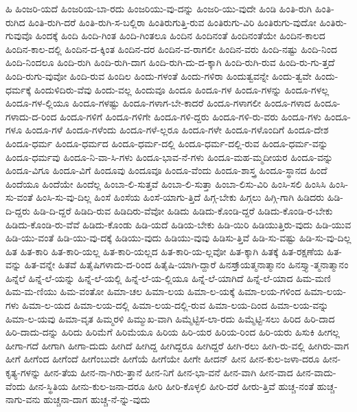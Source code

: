 {ಹಿ
ಹಿಂಜರಿ-ಯದೆ
ಹಿಂಜರಿಯ-ಬಾ-ರದು
ಹಿಂಜರಿಯು-ವು-ದನ್ನು
ಹಿಂಜರಿ-ಯು-ವುದೇ
ಹಿಂಡಿ
ಹಿಂತಿ-ರುಗಿ
ಹಿಂತಿ-ರುಗಿದ
ಹಿಂತಿ-ರುಗಿ-ದರೆ
ಹಿಂತಿ-ರುಗಿ-ಸ-ಬಲ್ಲಿರಾ
ಹಿಂತಿರುಗುತ್ತಿ-ರುವ
ಹಿಂತಿರುಗು-ವಿರಿ
ಹಿಂತಿರುಗು-ವುದೋ
ಹಿಂತಿರು-ಗುವುವೊ
ಹಿಂದಕ್ಕೆ
ಹಿಂದಿ
ಹಿಂದಿ-ಗಿಂತ
ಹಿಂದಿ-ಗಿಂತಲೂ
ಹಿಂದಿನ
ಹಿಂದಿನಂತೆ
ಹಿಂದಿನಂತೆಯೇ
ಹಿಂದಿನ-ಕಾಲದ
ಹಿಂದಿನ-ಕಾಲ-ದಲ್ಲಿ
ಹಿಂದಿನ-ದ-ಕ್ಕಿಂತ
ಹಿಂದಿನ-ದರ
ಹಿಂದಿನ-ವ-ರಾಗಲೀ
ಹಿಂದಿನ-ವರು
ಹಿಂದಿ-ನಷ್ಟು
ಹಿಂದಿ-ನಿಂದ
ಹಿಂದಿ-ನಿಂದಲೂ
ಹಿಂದಿ-ರುಗಿ
ಹಿಂದಿ-ರುಗಿ-ದಾಗ
ಹಿಂದಿ-ರುಗಿ-ದು-ದ-ಕ್ಕಾಗಿ
ಹಿಂದಿ-ರುಗಿ-ರುವ
ಹಿಂದಿ-ರು-ಗು-ತ್ತದೆ
ಹಿಂದಿ-ರುಗು-ವುವೋ
ಹಿಂದಿ-ರುವ
ಹಿಂದಿಲ
ಹಿಂದು-ಗಳಂತೆ
ಹಿಂದು-ಗಳಿರಾ
ಹಿಂದುತ್ವವನ್ನೇ
ಹಿಂದು-ತ್ವವೇ
ಹಿಂದು-ಧರ್ಮಕ್ಕೆ
ಹಿಂದುಳಿದಿರು-ವೆವು
ಹಿಂದು-ವಲ್ಲ
ಹಿಂದುವೂ
ಹಿಂದೂ
ಹಿಂದೂ-ಗಳ
ಹಿಂದೂ-ಗಳನ್ನು
ಹಿಂದೂ-ಗಳಲ್ಲ
ಹಿಂದೂ-ಗಳ-ಲ್ಲಿಯೂ
ಹಿಂದೂ-ಗಳಷ್ಟು
ಹಿಂದೂ-ಗಳಾಗ-ಬೇ-ಕಾದರೆ
ಹಿಂದೂ-ಗಳಾಗಲೀ
ಹಿಂದೂ-ಗಳಾದ
ಹಿಂದೂ-ಗಳಾದು-ದ-ರಿಂದ
ಹಿಂದೂ-ಗಳಿಗೆ
ಹಿಂದೂ-ಗಳಿಗೇ
ಹಿಂದೂ-ಗಳಿ-ದ್ದರು
ಹಿಂದೂ-ಗಳಿ-ರು-ವರು
ಹಿಂದೂ-ಗಳು
ಹಿಂದೂ-ಗಳೂ
ಹಿಂದೂ-ಗಳೆ
ಹಿಂದೂ-ಗಳೆಂದು
ಹಿಂದೂ-ಗಳೆ-ಲ್ಲರೂ
ಹಿಂದೂ-ಗಳೇ
ಹಿಂದೂ-ಗಳೊಂದಿಗೆ
ಹಿಂದೂ-ದೇಶ
ಹಿಂದೂ-ಧರ್ಮ
ಹಿಂದೂ-ಧರ್ಮದ
ಹಿಂದೂ-ಧರ್ಮ-ದಲ್ಲಿ
ಹಿಂದೂ-ಧರ್ಮ-ದಲ್ಲಿ-ರುವ
ಹಿಂದೂ-ಧರ್ಮ-ವನ್ನು
ಹಿಂದೂ-ಧರ್ಮವು
ಹಿಂದೂ-ನಿ-ವಾ-ಸಿ-ಗಳು
ಹಿಂದೂ-ಭಾವ-ನೆ-ಗಳು
ಹಿಂದೂ-ಮಹ-ಮ್ಮದೀಯರ
ಹಿಂದೂ-ವನ್ನು
ಹಿಂದೂ-ವಿಗೂ
ಹಿಂದೂ-ವಿಗೆ
ಹಿಂದೂವು
ಹಿಂದೂವೂ
ಹಿಂದೂ-ವೆಂದು
ಹಿಂದೂ-ಶಾಸ್ತ್ರ
ಹಿಂದೂ-ಸ್ಥಾನದ
ಹಿಂದೆ
ಹಿಂದೆಯೂ
ಹಿಂದೆಯೇ
ಹಿಂದೆಲ್ಲ
ಹಿಂಬಾ-ಲಿ-ಸುತ್ತವೆ
ಹಿಂಬಾ-ಲಿ-ಸುತ್ತಾ
ಹಿಂಬಾ-ಲಿಸು-ವಿರಿ
ಹಿಂಸಿ-ಸಲಿ
ಹಿಂಸಿಸಿ
ಹಿಂಸಿ-ಸು-ವಂತೆ
ಹಿಂಸಿ-ಸು-ವು-ದಿಲ್ಲ
ಹಿಂಸೆ
ಹಿಂಸೆಯ
ಹಿಂಸೆ-ಯಾಗು-ತ್ತಿದೆ
ಹಿಗ್ಗ-ಬೇಕು
ಹಿಗ್ಗಲು
ಹಿಗ್ಗಿ-ಗಾಗಿ
ಹಿಡಿದರು
ಹಿಡಿ-ದಿ-ದ್ದರು
ಹಿಡಿ-ದಿ-ದ್ದರೆ
ಹಿಡಿದಿ-ರುವ
ಹಿಡಿದಿರು-ವೆವೋ
ಹಿಡಿದು
ಹಿಡಿದು-ಕೊಂಡಿ-ದ್ದರೆ
ಹಿಡಿದು-ಕೊಂಡಿ-ರ-ಬೇಕು
ಹಿಡಿದು-ಕೊಂಡಿ-ರು-ವೆವೆ
ಹಿಡಿದು-ಕೊಂಡು
ಹಿಡಿ-ಯದೆ
ಹಿಡಿಯ-ಬೇಕು
ಹಿಡಿ-ಯಿರಿ
ಹಿಡಿಯುತ್ತಿರು-ವುದು
ಹಿಡಿ-ಯುವ
ಹಿಡಿ-ಯು-ವಂತೆ
ಹಿಡಿ-ಯು-ವು-ದಕ್ಕೆ
ಹಿಡಿಯು-ವುದು
ಹಿಡಿಯು-ವುವು
ಹಿಡಿಸು-ತ್ತಿವೆ
ಹಿಡಿ-ಸು-ವಷ್ಟು
ಹಿಡಿ-ಸು-ವು-ದಿಲ್ಲ
ಹಿತ
ಹಿತ-ಕಾರಿ
ಹಿತ-ಕಾರಿ-ಯಲ್ಲ
ಹಿತ-ಕಾರಿ-ಯಲ್ಲದ
ಹಿತ-ಕಾರಿ-ಯ-ಲ್ಲವೋ
ಹಿತ-ಕ್ಕಾಗಿ
ಹಿತಕ್ಕೆ
ಹಿತ-ರಕ್ಷಣೆಯ
ಹಿತ-ವನ್ನು
ಹಿತ-ವನ್ನೇ
ಹಿತವೆ
ಹಿತೈಷಿಗಳಾದು-ದ-ರಿಂದ
ಹಿತೈಷಿ-ಯಾಗಿ-ದ್ದಾರೆ
ಹಿನಸ್ತಾ್ಯತ್ಮನಾತ್ಮಾನಂ
ಹಿನಸ್ತ್ಯಾ-ತ್ಮನಾತ್ಮಾನಂ
ಹಿನ್ನೆಲೆ
ಹಿನ್ನೆ-ಲೆ-ಯನ್ನು
ಹಿನ್ನೆ-ಲೆ-ಯಲ್ಲಿ
ಹಿನ್ನೆ-ಲೆ-ಯ-ಲ್ಲಿಯೂ
ಹಿನ್ನೆ-ಲೆ-ಯಾಗಿದೆ
ಹಿನ್ನೆ-ಲೆ-ಯಾದ
ಹಿಮ-ಮಣಿ
ಹಿಮ-ಮ-ಣಿಯು
ಹಿಮ-ವಂತೋ
ಹಿಮಾ-ಚಲ
ಹಿಮಾ-ಲಯ
ಹಿಮಾ-ಲ-ಯಕ್ಕೆ
ಹಿಮಾ-ಲಯ-ಗಳಿಂದ
ಹಿಮಾ-ಲಯ-ಗಳು
ಹಿಮಾ-ಲ-ಯದ
ಹಿಮಾ-ಲಯ-ದಲ್ಲಿ
ಹಿಮಾ-ಲಯ-ದಲ್ಲಿ-ರುವ
ಹಿಮಾ-ಲಯ-ದಿಂದ
ಹಿಮಾ-ಲಯ-ವನ್ನು
ಹಿಮಾ-ಲ-ಯವು
ಹಿಮಾ-ವೃತ
ಹಿಮ್ಮರಳಿ
ಹಿಮ್ಮುಖ-ವಾಗಿ
ಹಿಮ್ಮೆಟ್ಟಿಸ-ಲಾ-ರದು
ಹಿಮ್ಮೆಟ್ಟಿ-ಸಲು
ಹಿರಿದ
ಹಿರಿ-ದಾದ
ಹಿರಿ-ದಾದು-ದನ್ನು
ಹಿರಿದು
ಹಿರಿಮೆಗೆ
ಹಿರಿಮೆಯೂ
ಹಿರಿಯ
ಹಿರಿ-ಯರ
ಹಿರಿಯ-ರಿಂದ
ಹಿರಿ-ಯರು
ಹಿಸುಕಿ
ಹೀಗಲ್ಲ
ಹೀಗಾ-ಗದೆ
ಹೀಗಾಗಿ
ಹೀಗಾ-ದುದು
ಹೀಗಿದೆ
ಹೀಗಿದ್ದ
ಹೀಗಿದ್ದರೂ
ಹೀಗಿದ್ದರೆ
ಹೀಗಿ-ರಲು
ಹೀಗಿ-ರು-ವಲ್ಲಿ
ಹೀಗಿರು-ವಾಗ
ಹೀಗೆ
ಹೀಗೆಂದ
ಹೀಗೆಂದೆ
ಹೀಗೆಂಬುದೇ
ಹೀಗೆಯೆ
ಹೀಗೆಯೇ
ಹೀಗೇ
ಹೀದನ್
ಹೀನ
ಹೀನ-ಕುಲ-ಜಳಾ-ದರೂ
ಹೀನ-ಕೃತ್ಯ-ಗಳನ್ನು
ಹೀನ-ತೆಯ
ಹೀನ-ನಾ-ಗಿರು-ತ್ತಾನೆ
ಹೀನ-ನಿಗೆ
ಹೀನ-ಭಾ-ವನೆ
ಹೀನ-ವಾಗಿ
ಹೀನ-ವಾದ
ಹೀನ-ವಾದು-ವೆಂದು
ಹೀನ-ಸ್ಥಿತಿಯ
ಹೀನು-ಕುಲ-ಜನಾ-ದರೂ
ಹೀರಿ
ಹೀರಿ-ಕೊಳ್ಳಲಿ
ಹೀರಿ-ದರೆ
ಹೀರು-ತ್ತಿವೆ
ಹುಚ್ಚ-ನಂತೆ
ಹುಚ್ಚ-ನಾಗು-ವನು
ಹುಚ್ಚನಾ-ದಾಗ
ಹುಚ್ಚ-ನೆ-ನ್ನು-ವುದು
}

